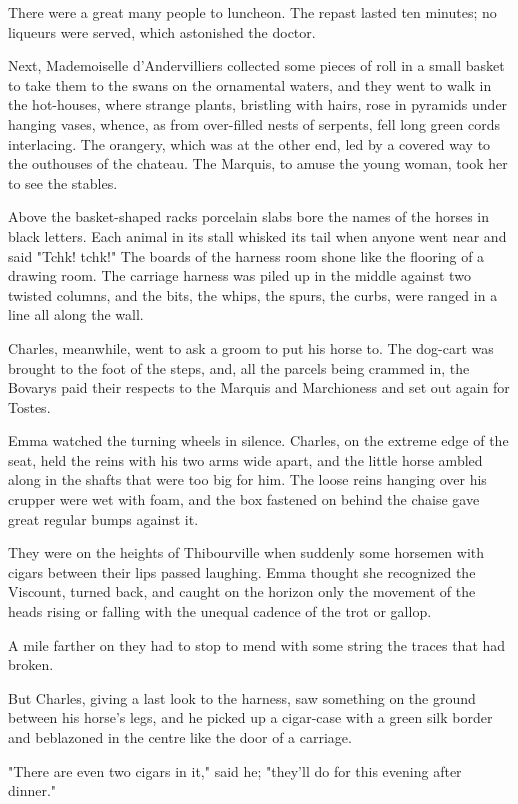 \documentclass{tufte-book}
\begin{document}
There were a great many people to luncheon. The repast lasted ten
minutes; no liqueurs were served, which astonished the doctor.

Next, Mademoiselle d'Andervilliers collected some pieces of roll in a
small basket to take them to the swans on the ornamental waters, and
they went to walk in the hot-houses, where strange plants, bristling
with hairs, rose in pyramids under hanging vases, whence, as from
over-filled nests of serpents, fell long green cords interlacing.
The orangery, which was at the other end, led by a covered way to the
outhouses of the chateau. The Marquis, to amuse the young woman, took
her to see the stables.

Above the basket-shaped racks porcelain slabs bore the names of the
horses in black letters. Each animal in its stall whisked its tail when
anyone went near and said "Tchk! tchk!" The boards of the harness room
shone like the flooring of a drawing room. The carriage harness was
piled up in the middle against two twisted columns, and the bits, the
whips, the spurs, the curbs, were ranged in a line all along the wall.

Charles, meanwhile, went to ask a groom to put his horse to. The
dog-cart was brought to the foot of the steps, and, all the parcels
being crammed in, the Bovarys paid their respects to the Marquis and
Marchioness and set out again for Tostes.

Emma watched the turning wheels in silence. Charles, on the extreme edge
of the seat, held the reins with his two arms wide apart, and the little
horse ambled along in the shafts that were too big for him. The loose
reins hanging over his crupper were wet with foam, and the box fastened
on behind the chaise gave great regular bumps against it.

They were on the heights of Thibourville when suddenly some horsemen
with cigars between their lips passed laughing. Emma thought she
recognized the Viscount, turned back, and caught on the horizon only the
movement of the heads rising or falling with the unequal cadence of the
trot or gallop.

A mile farther on they had to stop to mend with some string the traces
that had broken.

But Charles, giving a last look to the harness, saw something on the
ground between his horse's legs, and he picked up a cigar-case with
a green silk border and beblazoned in the centre like the door of a
carriage.

"There are even two cigars in it," said he; "they'll do for this evening
after dinner."
\end{document}
